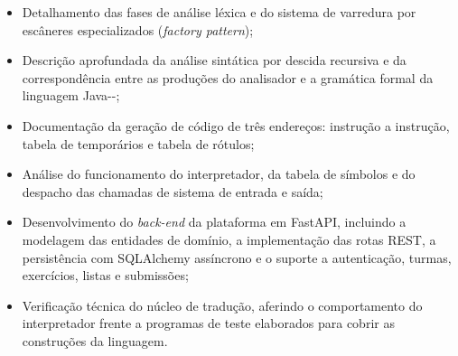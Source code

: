 \begin{itemize}
    \item Detalhamento das fases de análise léxica e do sistema de varredura por escâneres especializados (\textit{factory pattern});
    \item Descrição aprofundada da análise sintática por descida recursiva e da correspondência entre as produções do analisador e a gramática formal da linguagem Java-{}-;
    \item Documentação da geração de código de três endereços: instrução a instrução, tabela de temporários e tabela de rótulos;
    \item Análise do funcionamento do interpretador, da tabela de símbolos e do despacho das chamadas de sistema de entrada e saída;
    \item Desenvolvimento do \textit{back-end} da plataforma em FastAPI, incluindo a modelagem das entidades de domínio, a implementação das rotas REST, a persistência com SQLAlchemy assíncrono e o suporte a autenticação, turmas, exercícios, listas e submissões;
    \item Verificação técnica do núcleo de tradução, aferindo o comportamento do interpretador frente a programas de teste elaborados para cobrir as construções da linguagem.
\end{itemize}
